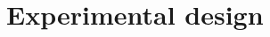 \documentclass[12pt]{article}
\newcommand{\todo}[1]{\textit{\textcolor{red}{$<$todo$>$ #1 $<$/todo$>$}}}
\begin{document}

















\section{Experimental design}
\label{sec:design}
\end{document}

